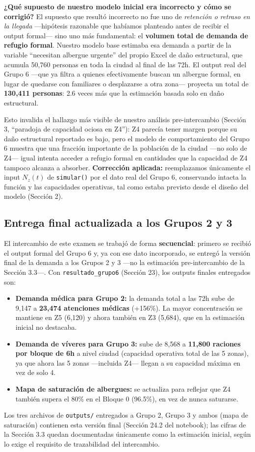 \documentclass[10pt,letterpaper]{article}
\begin{document}
\textbf{¿Qué supuesto de nuestro modelo inicial era incorrecto y cómo se corrigió?}
El supuesto que resultó incorrecto no fue uno de \textit{retención o retraso en la llegada} —hipótesis razonable que habíamos planteado antes de recibir el output formal— sino uno más fundamental: el \textbf{volumen total de demanda de refugio formal}. Nuestro modelo base estimaba esa demanda a partir de la variable ``necesitan albergue urgente'' del propio Excel de daño estructural, que acumula 50,760 personas en toda la ciudad al final de las 72h. El output real del Grupo 6 —que ya filtra a quienes efectivamente buscan un albergue formal, en lugar de quedarse con familiares o desplazarse a otra zona— proyecta un total de \textbf{130,411 personas}: 2.6 veces más que la estimación basada solo en daño estructural.

Esto invalida el hallazgo más visible de nuestro análisis pre-intercambio (Sección 3, ``paradoja de capacidad ociosa en Z4''): Z4 parecía tener margen porque su daño estructural reportado es bajo, pero el modelo de comportamiento del Grupo 6 muestra que una fracción importante de la población de la ciudad —no solo de Z4— igual intenta acceder a refugio formal en cantidades que la capacidad de Z4 tampoco alcanza a absorber. \textbf{Corrección aplicada:} reemplazamos únicamente el input $N_z(t)$ de \texttt{simular()} por el dato real del Grupo 6, conservando intacta la función y las capacidades operativas, tal como estaba previsto desde el diseño del modelo (Sección 2).

\subsection{Entrega final actualizada a los Grupos 2 y 3}
El intercambio de este examen se trabajó de forma \textbf{secuencial}: primero se recibió el output formal del Grupo 6 y, ya con ese dato incorporado, se entregó la versión final de la demanda a los Grupos 2 y 3 —no la estimación pre-intercambio de la Sección 3.3—. Con \texttt{resultado\_grupo6} (Sección 23), los outputs finales entregados son:
\begin{itemize}
    \item \textbf{Demanda médica para Grupo 2:} la demanda total a las 72h sube de 9,147 a \textbf{23,474 atenciones médicas} (+156\%). La mayor concentración se mantiene en Z5 (6,120) y ahora también en Z3 (5,684), que en la estimación inicial no destacaba.
    \item \textbf{Demanda de víveres para Grupo 3:} sube de 8,568 a \textbf{11,800 raciones por bloque de 6h} a nivel ciudad (capacidad operativa total de las 5 zonas), ya que ahora las 5 zonas —incluida Z4— llegan a su capacidad máxima en vez de solo 4.
    \item \textbf{Mapa de saturación de albergues:} se actualiza para reflejar que Z4 también supera el 80\% en el Bloque 0 (96.5\%), en vez de nunca saturarse.
\end{itemize}
Los tres archivos de \texttt{outputs/} entregados a Grupo 2, Grupo 3 y ambos (mapa de saturación) contienen esta versión final (Sección 24.2 del notebook); las cifras de la Sección 3.3 quedan documentadas únicamente como la estimación inicial, según lo exige el requisito de trazabilidad del intercambio.
\end{document}
